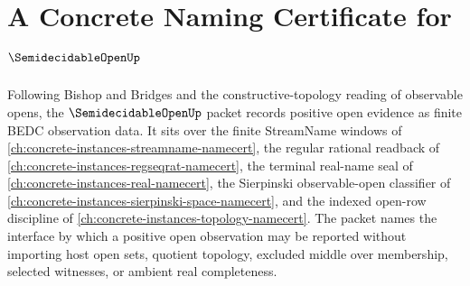 \chapter{A Concrete Naming Certificate for $\SemidecidableOpenUp$}
\label{ch:concrete-instances-semidecidable-open-namecert}

Following Bishop and Bridges and the constructive-topology reading of observable opens, the $\SemidecidableOpenUp$ packet records positive open evidence as finite BEDC observation data. It sits over the finite StreamName windows of \autoref{ch:concrete-instances-streamname-namecert}, the regular rational readback of \autoref{ch:concrete-instances-regseqrat-namecert}, the terminal real-name seal of \autoref{ch:concrete-instances-real-namecert}, the Sierpinski observable-open classifier of \autoref{ch:concrete-instances-sierpinski-space-namecert}, and the indexed open-row discipline of \autoref{ch:concrete-instances-topology-namecert}. The packet names the interface by which a positive open observation may be reported without importing host open sets, quotient topology, excluded middle over membership, selected witnesses, or ambient real completeness.

